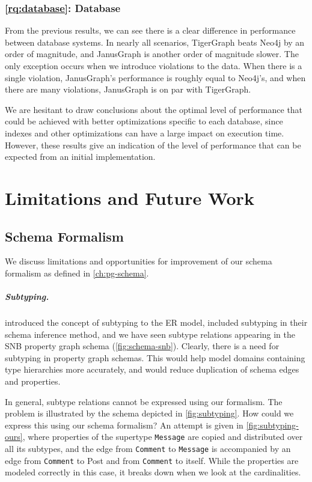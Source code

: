 \documentclass{report}
\theoremstyle{definition}
\begin{document}
\subsection{\ref*{rq:database}: Database}

From the previous results, we can see there is a clear difference in performance between database systems. In nearly all scenarios, TigerGraph beats Neo4j by an order of magnitude, and JanusGraph is another order of magnitude slower. The only exception occurs when we introduce violations to the data. When there is a single violation, JanusGraph's performance is roughly equal to Neo4j's, and when there are many violations, JanusGraph is on par with TigerGraph.

We are hesitant to draw conclusions about the optimal level of performance that could be achieved with better optimizations specific to each database, since indexes and other optimizations can have a large impact on execution time. However, these results give an indication of the level of performance that can be expected from an initial implementation.

\chapter{Limitations and Future Work}
\label{ch:limitations}

\section{Schema Formalism}

We discuss limitations and opportunities for improvement of our schema formalism as defined in \autoref{ch:pg-schema}.

\paragraph{Subtyping.} \citet{barker1990entity} introduced the concept of subtyping to the ER model, \citet{lbath2021inference} included subtyping in their schema inference method, and we have seen subtype relations appearing in the SNB property graph schema (\autoref{fig:schema-snb}). Clearly, there is a need for subtyping in property graph schemas. This would help model domains containing type hierarchies more accurately, and would reduce duplication of schema edges and properties.

In general, subtype relations cannot be expressed using our formalism. The problem is illustrated by the schema depicted in \autoref{fig:subtyping}. How could we express this using our schema formalism? An attempt is given in \autoref{fig:subtyping-ours}, where properties of the supertype \texttt{Message} are copied and distributed over all its subtypes, and the edge from \texttt{Comment} to \texttt{Message} is accompanied by an edge from \texttt{Comment} to Post and from \texttt{Comment} to itself. While the properties are modeled correctly in this case, it breaks down when we look at the cardinalities.
\end{document}

